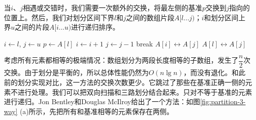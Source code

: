 \documentclass[b5paper]{ctexart}
\begin{document}
当$i$、$j$相遇或交错时，我们需要一次额外的交换，将最左侧的基准$p$交换到$j$指向的位置上。然后，我们对划分区间下界$l$和$j$之间的数组片段$A[l ... j)$；$i$和划分区间上界$u$之间的片段$A[i ... u)$进行递归排序。

\begin{algorithmic}[1]
 \Comment{排序区间：$[l, u)$}
   
    \State $i \gets l$, $j \gets u$
    \State $p \gets A[l]$ 
    \Loop
      \Repeat
        \State $i \gets i + 1$
       
      \Repeat
        \State $j \gets j - 1$
       
        \State break
      \EndIf
      \State {} $A[i] \leftrightarrow A[j]$
    \EndLoop
    \State {} $A[l] \leftrightarrow A[j]$ 
    \State {}
    \State {}
  \EndIf
\EndProcedure
\end{algorithmic}

考虑所有元素都相等的极端情况：数组划分为两段长度相等的子数组，发生了$\dfrac{n}{2}$次交换。由于划分是平衡的，所以总体性能仍然为$O(n \lg n)$，而没有退化。和此前的划分实现对比，这一方法的交换次数更少。它跳过了那些在基准正确一侧的元素不进行处理。我们可以把双向扫描和三路划分结合起来。只对不等于基准的元素进行递归。Jon Bentley和Douglas McIlroy给出了一个方法：如图\ref{fig:partition-3-way} (a)所示，先把所有和基准相等的元素保存在两侧\cite{3-way-part}\cite{opt-qs}。
\end{document}
